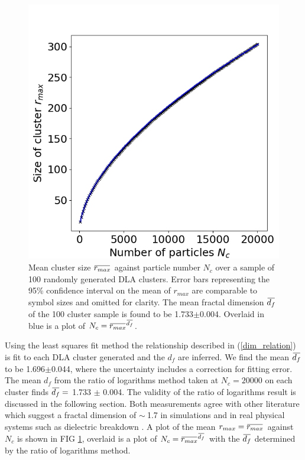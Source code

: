 \documentclass[10pt, twocolumn]{article} %
\newcommand{\overbar}[1]{\mkern 1.5mu\overline{\mkern-1.5mu#1\mkern-1.5mu}\mkern 1.5mu}
\begin{document}
\begin{figure}[t!]
\centering
\includegraphics[width=0.95\columnwidth]{100x20k_R.png}
  \caption{
    Mean cluster size $\overbar{r_{max}}$ against particle number $N_c$ over a sample of 100 randomly generated DLA clusters. Error bars representing the 95\% confidence interval on the mean of $r_{max}$ are comparable to symbol sizes and omitted for clarity. The mean fractal dimension $\overbar{d_f}$ of the 100 cluster sample is found to be 1.733$\pm$0.004. Overlaid in blue is a plot of $N_c={\overbar{r_{max}}}^{\overbar{d_f}}$.
  }
  \label{20k_R}
\end{figure}

  Using the least squares fit method the relationship described in (\ref{dim_relation}) is fit to each DLA cluster generated and the $d_f$ are inferred. We find the mean $\overbar{d_f}$ to be 1.696$\pm$0.044, where the uncertainty includes a correction for fitting error. The mean $d_f$ from the ratio of logarithms method taken at $N_c = 20000$ on each cluster finds $\overbar{d_f} =$ 1.733 $\pm$ 0.004. The validity of the ratio of logarithms result is discussed in the following section. Both measurements agree with other literature which suggest a fractal dimension of $\sim~$1.7 in simulations \cite{Witten_1981, Choi_2011, Ranguelov_2011} and in real physical systems such as dielectric breakdown \cite{Pietronero_1984, Irurzun_2002}. A plot of the mean $r_{max} = \overbar{r_{max}}$ against $N_c$ is shown in FIG \ref{20k_R}, overlaid is a plot of $N_c={\overbar{r_{max}}}^{\overbar{d_f}}$ with the $\overbar{d_f}$ determined by the ratio of logarithms method.
\end{document}
